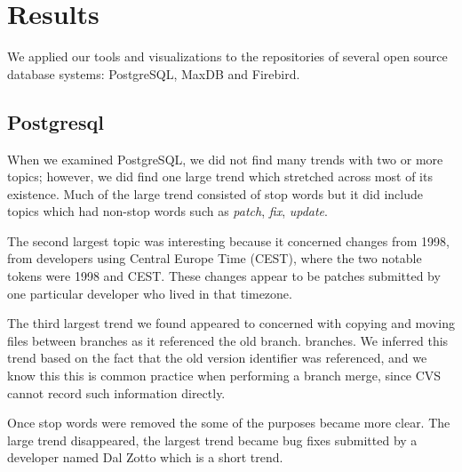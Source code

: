 \documentclass[times, 10pt,twocolumn]{article}
\begin{document}










\section{Results}

We applied our tools and visualizations to the repositories of several
open source database systems: PostgreSQL, MaxDB and Firebird.




\subsection{Postgresql}


When we examined PostgreSQL, we did not find many trends with two or more topics; however, we did find one large trend which stretched across most of its existence.
 Much of the large trend consisted of stop words but it did
include topics which had non-stop words such as \emph{patch}, \emph{fix}, \emph{update}.

The second largest topic was interesting because it concerned changes from
1998, from developers using Central Europe Time (CEST), where the two
notable tokens were 1998 and CEST. These changes appear to be patches
submitted by one particular developer who lived in that timezone.

The third largest trend we found appeared to concerned with copying
and moving files between branches as it referenced the old branch.
branches.  We inferred this trend based on the fact that the old
version identifier was referenced, and we know this this is common
practice when performing a branch merge, since CVS cannot record such
information directly.


Once stop words were removed the some of the purposes became more
clear. The large trend disappeared, the largest trend became bug fixes
submitted by a developer named Dal Zotto which is a short trend.
\end{document}
